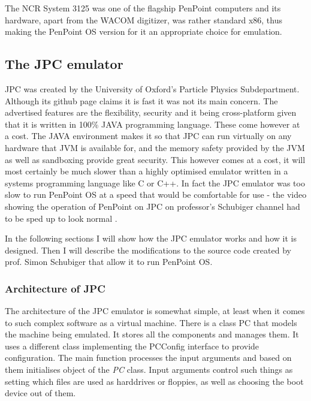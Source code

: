 The NCR System 3125 was one of the flagship PenPoint computers and its
hardware, apart from the WACOM digitizer, was rather standard x86, thus making
the PenPoint OS version for it an appropriate choice for emulation.

\subsection{The JPC emulator}

JPC was created by the University of Oxford's Particle Physics Subdepartment.
Although its github page claims it is fast it was not its main concern. The
advertised features are the flexibility, security and it being cross-platform
given that it is written in 100\% JAVA programming language. These come however
at a cost. The JAVA environment makes it so that JPC can run virtually on any
hardware that JVM is available for, and the memory safety provided by the JVM
as well as sandboxing provide great security. This however comes at a cost, it
will most certainly be much slower than a highly optimised emulator written in
a systems programming language like C or C++. In fact the JPC emulator was too
slow to run PenPoint OS at a speed that would be comfortable for use - the
video showing the operation of PenPoint on JPC on professor's Schubiger channel
had to be sped up to look normal \cite{schubiger2015}.

In the following sections I will show how the JPC emulator works and how it is
designed. Then I will describe the modifications to the source code created by
prof. Simon Schubiger that allow it to run PenPoint OS.

\subsubsection{Architecture of JPC}

The architecture of the JPC emulator is somewhat simple, at least when it comes
to such complex software as a virtual machine. There is a class PC that models
the machine being emulated. It stores all the components and manages them. It
uses a different class implementing the PCConfig interface to provide
configuration. The main function processes the input arguments and based on
them initialises object of the \emph{PC} class. Input arguments control such things
as setting which files are used as harddrives or floppies, as well as choosing
the boot device out of them.

\begin{codeblock}
    
\end{codeblock}

